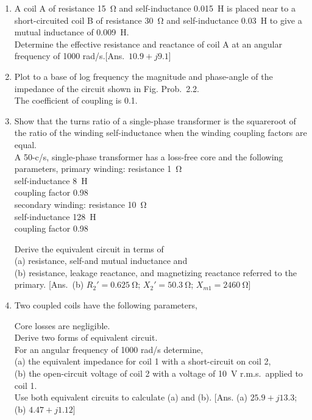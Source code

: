 \documentclass[a4paper,numbers=noenddot,12pt]{scrbook}
\begin{document}
\begin{enumerate}[label={\thechapter.\arabic*},leftmargin=*]
\item A coil A of resistance \SI{15}{\ohm} and self-inductance \SI{0.015}{\henry} is placed near to a short-circuited coil B of resistance \SI{30}{\ohm} and self-inductance \SI{0.03}{\henry} to give a mutual inductance of \SI{0.009}{\henry}.\\ \indent 
Determine the effective resistance and reactance of coil A at an angular frequency of 1000 rad/s.[Ans.\ $10.9 + j9.1$]

\item Plot to a base of log frequency the magnitude and phase-angle of the impedance of the circuit shown in Fig. Prob.\ 2.2.\\ 
The coefficient of coupling is 0.1.

\item Show that the turns ratio of a single-phase transformer is the square­root of the ratio of the winding self-inductance when the winding coupling factors are equal.\\
A 50-c/s, single-phase transformer has a loss-free core and the following parameters,
primary winding: resistance \SI{1}{\ohm}\\
self-inductance \SI{8}{\henry}\\
coupling factor 0.98\\
secondary winding: 	resistance \SI{10}{\ohm}\\
self-inductance \SI{128}{\henry} \\
coupling factor 0.98

Derive the equivalent circuit in terms of \\
(a) resistance, self-and mutual inductance and \\
(b) resistance, leakage reactance, and magnetizing reactance referred to the primary. 
[Ans.\ (b) $R_2' = \SI{0.625}{\ohm}$; $X_2' = \SI{50.3}{\ohm}$; $X_{m1} = \SI{2460}{\ohm}$]

\item Two coupled coils have the following parameters, 

Core losses are negligible. \\
Derive two forms of equivalent circuit. \\
For an angular frequency of 1000 rad/s determine, \\
(a) the equivalent impedance for coil 1 with a short-circuit on coil 2, \\
(b) the open-circuit voltage of coil 2 with a voltage of \SI{10}{\volt} r.m.s.\ applied to coil 1. \\
Use both equivalent circuits to calculate (a) and (b). 
[Ans. (a) $25.9 + j 13.3$; (b) $4.47 + j1.12$]


\end{enumerate}
\end{document}

